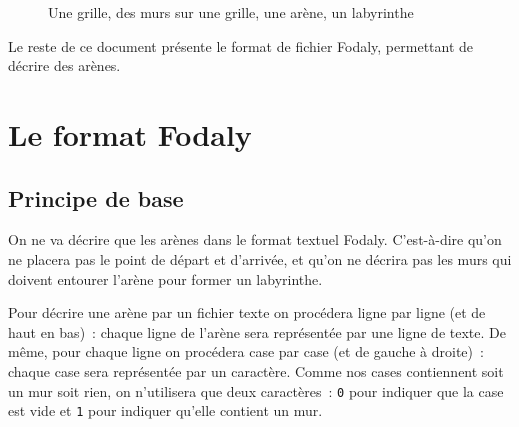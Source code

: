 \documentclass[a4paper]{paper}
\newcommand{\nomFormat}{Fodaly}
\begin{document}
\begin{figure}[htbp]
{}
  \caption{Une grille, des murs sur une grille, une arène, un labyrinthe}\label{fig:grille2}
\end{figure}

Le reste de ce document présente le format de fichier \nomFormat{}, permettant de décrire des arènes.

\section{Le format \nomFormat{}}

\subsection{Principe de base}
\label{section:base}

On ne va décrire que les arènes dans le format textuel \nomFormat{}.
C'est-à-dire qu'on ne placera pas le point de départ et d'arrivée, et qu'on ne décrira pas les murs qui doivent entourer l'arène pour former un labyrinthe.

Pour décrire une arène par un fichier texte on procédera ligne par ligne (et de haut en bas)~: chaque ligne de l'arène sera représentée par une ligne de texte.
De même, pour chaque ligne on procédera case par case (et de gauche à droite)~: chaque case sera représentée par un caractère.
Comme nos cases contiennent soit un mur soit rien, on n'utilisera que deux caractères~: \verb|0| pour indiquer que la case est vide et \verb|1| pour indiquer qu'elle contient un mur.
\end{document}
